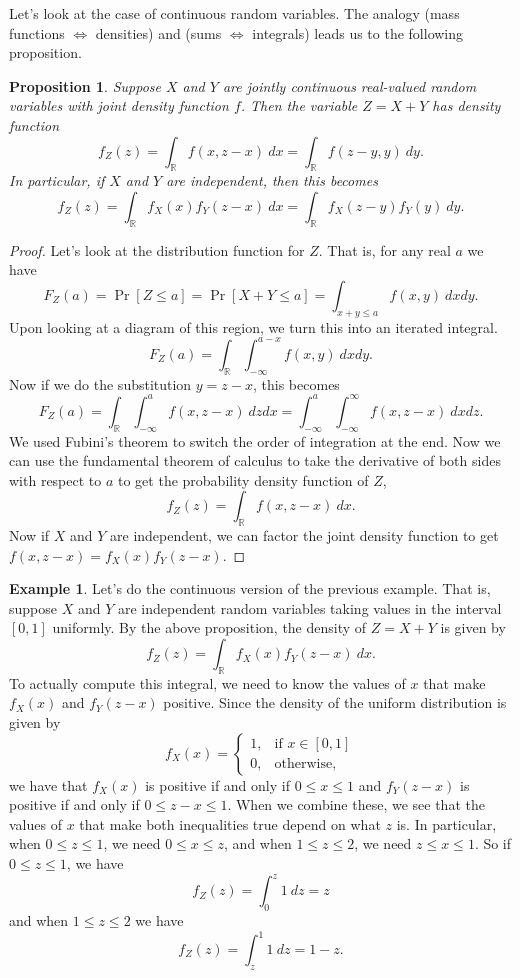 \documentclass[12pt]{article}
\theoremstyle{plain}
\newtheorem{proposition}[theorem]{Proposition}
\theoremstyle{definition}
\newtheorem{example}[theorem]{Example}
\theoremstyle{remark}
\newcommand{\R}{\mathbb{R}}
\begin{document}
Let's look at the case of continuous random variables.
The analogy (mass functions $\iff$ densities) and (sums $\iff$ integrals) leads us to the following proposition.
\begin{proposition}
    Suppose $X$ and $Y$ are jointly continuous real-valued random variables with joint density function $f$.
    Then the variable $Z = X+Y$ has density function
    \[
        f_Z(z) = \int_\R f(x, z-x)\ dx = \int_\R f(z-y, y)\ dy.
    \]
    In particular, if $X$ and $Y$ are independent, then this becomes
    \[
        f_Z(z) = \int_\R f_X(x)f_Y(z-x)\ dx = \int_\R f_X(z-y)f_Y(y)\ dy.
    \]
\end{proposition}
\begin{proof}
    Let's look at the distribution function for $Z$.
    That is, for any real $a$ we have
    \[
        F_Z(a) = \Pr[Z\leq a] = \Pr[X+Y \leq a] = \int_{x + y\leq a}f(x,y)\ dxdy.
    \]
    Upon looking at a diagram of this region, we turn this into an iterated integral.
    \[
        F_Z(a) = \int_\R \int_{-\infty}^{a-x}f(x, y)\ dxdy.
    \]
    Now if we do the substitution $y = z-x$, this becomes
    \[
        F_Z(a) = \int_\R\int_{-\infty}^af(x, z-x)\ dzdx = \int_{-\infty}^a\int_{-\infty}^\infty f(x, z-x)\ dxdz.
    \]
    We used Fubini's theorem to switch the order of integration at the end.
    Now we can use the fundamental theorem of calculus to take the derivative of both sides with respect to $a$ to get the probability density function of $Z$,
    \[
        f_Z(z) = \int_\R f(x, z-x)\ dx.
    \]
    Now if $X$ and $Y$ are independent, we can factor the joint density function to get $f(x,z-x) = f_X(x)f_Y(z-x)$.
\end{proof}

\begin{example}
    Let's do the continuous version of the previous example.
    That is, suppose $X$ and $Y$ are independent random variables taking values in the interval $[0, 1]$ uniformly.
    By the above proposition, the density of $Z= X+Y$ is given by
    \[
        f_Z(z) = \int_\R f_X(x)f_Y(z-x)\ dx.
    \]
    To actually compute this integral, we need to know the values of $x$ that make $f_X(x)$ and $f_Y(z-x)$ positive.
    Since the density of the uniform distribution is given by
    \[
        f_X(x) = \begin{cases}
            1,&\text{if }x\in [0,1]\\
            0,&\text{otherwise,}
        \end{cases}
    \]
    we have that $f_X(x)$ is positive if and only if $0\leq x\leq 1$ and $f_Y(z-x)$ is positive if and only if $0\leq z-x\leq 1$.
    When we combine these, we see that the values of $x$ that make both inequalities true depend on what $z$ is.
    In particular, when $0\leq z\leq 1$, we need $0\leq x \leq z$, and when $1\leq z\leq 2$, we need $z\leq x\leq 1$.
    So if $0\leq z\leq 1$, we have
    \[
        f_Z(z) = \int_0^z 1\ dz = z
    \]
    and when $1\leq z\leq 2$ we have
    \[
        f_Z(z) = \int_z^1 1\ dz = 1-z.
    \]
\end{example}
\end{document}
